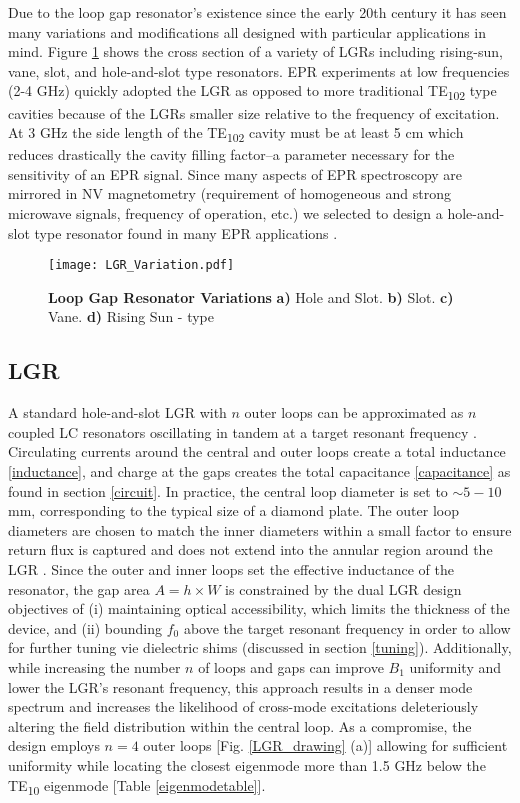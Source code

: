 Due to the loop gap resonator's existence since the early 20th century \cite{collins1948microwave} it has seen many variations and modifications all designed with particular applications in mind. Figure \ref{LGR_variation} shows the cross section of a variety of LGRs including rising-sun, vane, slot, and hole-and-slot type resonators. EPR experiments at low frequencies (2-4 GHz) quickly adopted the LGR as opposed to more traditional TE\textsubscript{102} type cavities because of the LGRs smaller size relative to the frequency of excitation. At 3 GHz the side length of the TE\textsubscript{102} cavity must be at least 5 cm which reduces drastically the cavity filling factor--a parameter necessary for the sensitivity of an EPR signal. Since many aspects of EPR spectroscopy are mirrored in NV magnetometry (requirement of homogeneous and strong microwave signals, frequency of operation, etc.) we selected to design a hole-and-slot type resonator found in many EPR applications \cite{}.  
\vspace{5mm}
\begin{figure}[h!]
\centering
\texttt{[image: LGR\_Variation.pdf]}  
\caption{\textbf{Loop Gap Resonator Variations} \textbf{a)} Hole and Slot. \textbf{b)} Slot. \textbf{c)} Vane. \textbf{d)} Rising Sun - type}
\label{LGR_variation}
\end{figure}


\subsection{LGR}

A standard hole-and-slot LGR with $n$ outer loops can be approximated as $n$ coupled LC resonators oscillating in tandem at a target resonant frequency \cite{wood1984loop}. Circulating currents around the central and outer loops create a total inductance \ref{inductance}, and charge at the gaps creates the total capacitance \ref{capacitance} as found in section \ref{circuit}. In practice, the central loop diameter is set to $\sim 5-10 $ mm, corresponding to the typical size of a diamond plate. The outer loop diameters are chosen to match the inner diameters within a small factor to ensure return flux is captured and does not extend into the annular region around the LGR \cite{}. Since the outer and inner loops set the effective inductance of the resonator, the gap area $A = h \times W$ is constrained by the dual LGR design objectives of (i) maintaining optical accessibility, which limits the thickness of the device, and (ii) bounding $f_0$ above the target resonant frequency in order to allow for further tuning vie dielectric shims (discussed in section \ref{tuning}). Additionally, while increasing the number $n$ of loops and gaps can improve $B_1$ uniformity \cite{piasecki1993field} and lower the LGR's resonant frequency, this approach results in a denser mode spectrum \cite{froncisz1982loop} and increases the likelihood of cross-mode excitations deleteriously altering the field distribution within the central loop. As a compromise, the design employs $n=4$ outer loops [Fig. \ref{LGR_drawing} (a)] allowing for sufficient uniformity while locating the closest eigenmode more than 1.5 GHz below the TE\textsubscript{10} eigenmode [Table \ref{eigenmodetable}].  

